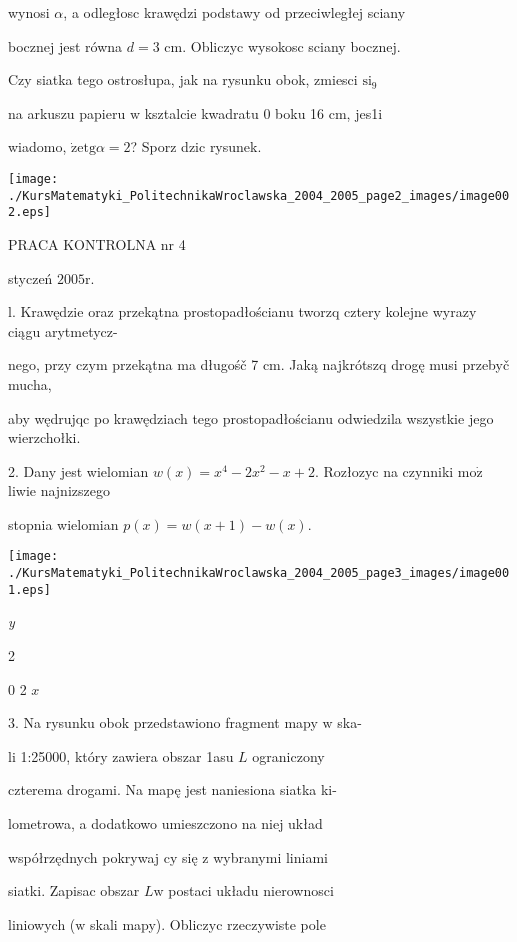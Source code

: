 \documentclass[a4paper,12pt]{article}
\begin{document}
wynosi $\alpha$, a odległosc krawędzi podstawy od przeciwległej sciany

bocznej jest równa $d=3$ cm. Obliczyc wysokosc sciany bocznej.

Czy siatka tego ostrosłupa, jak na rysunku obok, zmiesci $\mathrm{s}\mathrm{i}_{9}$

na arkuszu papieru $\mathrm{w}$ ksztalcie kwadratu $0$ boku 16 cm, jes1i

wiadomo, $\dot{\mathrm{z}}\mathrm{e}\mathrm{t}\mathrm{g}\alpha=2$? Sporz dzic rysunek.
\begin{center}
\texttt{[image: ./KursMatematyki\_PolitechnikaWroclawska\_2004\_2005\_page2\_images/image002.eps]}
\end{center}




PRACA KONTROLNA nr 4

styczeń $2005\mathrm{r}.$

l. Krawędzie oraz przekątna prostopadłościanu tworzq cztery kolejne wyrazy ciągu arytmetycz-

nego, przy czym przekątna ma długośč 7 cm. Jaką najkrótszq drogę musi przebyč mucha,

aby wędrujqc po krawędziach tego prostopadłościanu odwiedzila wszystkie jego wierzchołki.

2. Dany jest wielomian $w(x)=x^{4}-2x^{2}-x+2$. Rozłozyc na czynniki $\mathrm{m}\mathrm{o}\dot{\mathrm{z}}$ liwie najnizszego

stopnia wielomian $p(x)=w(x+1)-w(x).$
\begin{center}
\texttt{[image: ./KursMatematyki\_PolitechnikaWroclawska\_2004\_2005\_page3\_images/image001.eps]}
\end{center}
{\it y}

2

0 2 $x$

3. Na rysunku obok przedstawiono fragment mapy $\mathrm{w}$ ska-

li 1:25000, który zawiera obszar 1asu $L$ ograniczony

czterema drogami. Na mapę jest naniesiona siatka ki-

lometrowa, a dodatkowo umieszczono na niej układ

współrzędnych pokrywaj cy się $\mathrm{z}$ wybranymi liniami

siatki. Zapisac obszar $L\mathrm{w}$ postaci układu nierownosci

liniowych ($\mathrm{w}$ skali mapy). Obliczyc rzeczywiste pole
\end{document}
